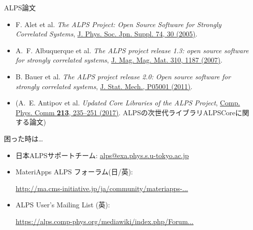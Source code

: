 \begin{frame}[t,fragile]{ALPS論文}
  \begin{itemize}
  \item F. Alet et al. {\it The ALPS Project: Open Source Software for
    Strongly Correlated Systems}, \href{http://jpsj.ipap.jp/link?JPSJS/74S/30}{J. Phys. Soc. Jpn. Suppl. 74, 30 (2005)}.
  \item A.~F. Albuquerque et al. {\it The ALPS project release 1.3: open source software for strongly correlated systems}, \href{http://dx.doi.org/10.1016/j.jmmm.2006.10.304}{J. Mag. Mag. Mat. 310, 1187 (2007)}.
  \item B. Bauer et al. {\it The ALPS project release 2.0: Open source software for strongly correlated systems}, \href{http://iopscience.iop.org/1742-5468/2011/05/P05001}{J. Stat. Mech., P05001 (2011)}.
  \item (A.~E. Antipov et al. {\it Updated Core Libraries of the ALPS Project}, \href{http://dx.doi.org/10.1016/j.cpc.2016.12.009}{Comp. Phys. Comm {\bf 213}, 235--251 (2017)}. ALPSの次世代ライブラリALPSCoreに関する論文)
  \end{itemize}
\end{frame}

\begin{frame}[t,fragile]{困った時は…}
  \begin{itemize}
    \setlength{\itemsep}{1em}
  \item 日本ALPSサポートチーム: {\href{mailto:alps@exa.phys.s.u-tokyo.ac.jp}{alps@exa.phys.s.u-tokyo.ac.jp}}
  \item MateriApps ALPS フォーラム(日/英):

    {\footnotesize \href{http://ma.cms-initiative.jp/ja/community/materiapps-messageboard/alps}{http://ma.cms-initiative.jp/ja/community/materiapps-...}}
  \item ALPS User's Mailing List (英):

    {\footnotesize \href{https://alps.comp-phys.org/mediawiki/index.php/Forum:Overview}{https://alps.comp-phys.org/mediawiki/index.php/Forum...}}
  \end{itemize}
\end{frame}

